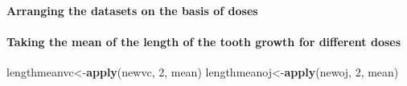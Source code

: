 \documentclass[]{article}
\newenvironment{Shaded}{\begin{snugshade}}{\end{snugshade}}
\newcommand{\KeywordTok}[1]{\textcolor[rgb]{0.13,0.29,0.53}{\textbf{#1}}}
\newcommand{\DecValTok}[1]{\textcolor[rgb]{0.00,0.00,0.81}{#1}}
\newcommand{\FloatTok}[1]{\textcolor[rgb]{0.00,0.00,0.81}{#1}}
\newcommand{\OperatorTok}[1]{\textcolor[rgb]{0.81,0.36,0.00}{\textbf{#1}}}
\newcommand{\NormalTok}[1]{#1}
\let\oldparagraph\paragraph
\renewcommand{\paragraph}[1]{\oldparagraph{#1}\mbox{}}
\begin{document}
\paragraph{Arranging the datasets on the basis of
doses}\label{arranging-the-datasets-on-the-basis-of-doses}

\begin{Shaded}
\end{Shaded}

\paragraph{Taking the mean of the length of the tooth growth for
different
doses}\label{taking-the-mean-of-the-length-of-the-tooth-growth-for-different-doses}

\begin{Shaded}
\begin{Highlighting}[]
\NormalTok{lengthmeanvc<-}\KeywordTok{apply}\NormalTok{(newvc, }\DecValTok{2}\NormalTok{, mean)}
\NormalTok{lengthmeanoj<-}\KeywordTok{apply}\NormalTok{(newoj, }\DecValTok{2}\NormalTok{, mean)}
\end{Highlighting}
\end{Shaded}
\end{document}
